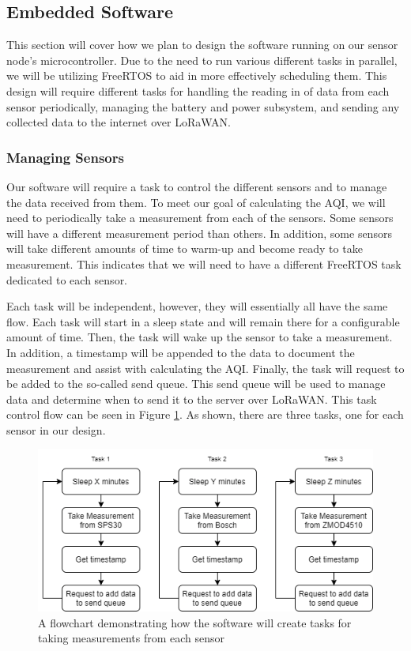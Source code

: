 \subsection{Embedded Software}
This section will cover how we plan to design the software running on our sensor node's microcontroller. Due to the need to run various different tasks in parallel, we will be utilizing FreeRTOS to aid in more effectively scheduling them. This design will require different tasks for handling the reading in of data from each sensor periodically, managing the battery and power subsystem, and sending any collected data to the internet over LoRaWAN.

\subsubsection{Managing Sensors}
Our software will require a task to control the different sensors and to manage the data received from them. To meet our goal of calculating the AQI, we will need to periodically take a measurement from each of the sensors. Some sensors will have a different measurement period than others. In addition, some sensors will take different amounts of time to warm-up and become ready to take measurement. This indicates that we will need to have a different FreeRTOS task dedicated to each sensor.

Each task will be independent, however, they will essentially all have the same flow. Each task will start in a sleep state and will remain there for a configurable amount of time. Then, the task will wake up the sensor to take a measurement. In addition, a timestamp will be appended to the data to document the measurement and assist with calculating the AQI. Finally, the task will request to be added to the so-called send queue. This send queue will be used to manage data and determine when to send it to the server over LoRaWAN. This task control flow can be seen in Figure \ref{fig:measurement-flow}. As shown, there are three tasks, one for each sensor in our design.

\begin{figure}[H]
    \centering
    \includegraphics[width=6in]{figures/measurement-flow.png}
    \caption{A flowchart demonstrating how the software will create tasks for taking measurements from each sensor}
    \label{fig:measurement-flow} 
\end{figure}

